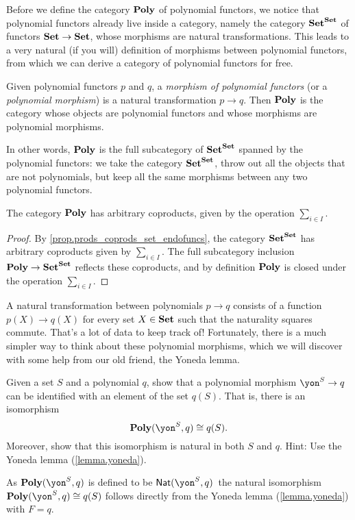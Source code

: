 \documentclass[Book-Poly]{subfiles}
\begin{document}
Before we define the category $\textbf{Poly}$ of polynomial functors, we notice that polynomial functors already live inside a category, namely the category $\textbf{Set}^{\textbf{Set}}$ of functors $\textbf{Set} \to \textbf{Set}$, whose morphisms are natural transformations.
This leads to a very natural (if you will) definition of morphisms between polynomial functors, from which we can derive a category of polynomial functors for free.

\begin{definition}
Given polynomial functors $p$ and $q$, a \emph{morphism of polynomial functors} (or a \emph{polynomial morphism}) is a natural transformation $p\to q$.
Then $\textbf{Poly}$ is the category whose objects are polynomial functors and whose morphisms are polynomial morphisms.
\end{definition}

In other words, $\textbf{Poly}$ is the full subcategory of $\textbf{Set}^{\textbf{Set}}$ spanned by the polynomial functors: we take the category $\textbf{Set}^{\textbf{Set}}$, throw out all the objects that are not polynomials, but keep all the same morphisms between any two polynomial functors.

\begin{proposition} \label{prop.poly_coprods}
The category $\textbf{Poly}$ has arbitrary coproducts, given by the operation $\sum_{i \in I}$.
\end{proposition}
\begin{proof}
By \cref{prop.prods_coprods_set_endofuncs}, the category $\textbf{Set}^{\textbf{Set}}$ has arbitrary coproducts given by $\sum_{i \in I}$.
The full subcategory inclusion $\textbf{Poly} \to \textbf{Set}^{\textbf{Set}}$ reflects these coproducts, and by definition $\textbf{Poly}$ is closed under the operation $\sum_{i \in I}$.
\end{proof}

A natural transformation between polynomials $p \to q$ consists of a function $p(X) \to q(X)$ for every set $X \in \textbf{Set}$ such that the naturality squares commute.
That's a lot of data to keep track of!
Fortunately, there is a much simpler way to think about these polynomial morphisms, which we will discover with some help from our old friend, the Yoneda lemma.

\begin{exercise} \label{exc.poly_morph_yoneda}
Given a set $S$ and a polynomial $q$, show that a polynomial morphism $\yon^S \to q$ can be identified with an element of the set $q(S)$.
That is, there is an isomorphism
\[
    \poly(\yon^S, q) \iso q(S).
\]
Moreover, show that this isomorphism is natural in both $S$ and $q$.
Hint: Use the Yoneda lemma (\cref{lemma.yoneda}).
\begin{solution}
As $\poly(\yon^S, q)$ is defined to be $\nat(\yon^S, q)$\, the natural isomorphism $\poly(\yon^S, q) \iso q(S)$ follows directly from the Yoneda lemma (\cref{lemma.yoneda}) with $F = q$.
\end{solution}
\end{exercise}
\end{document}
